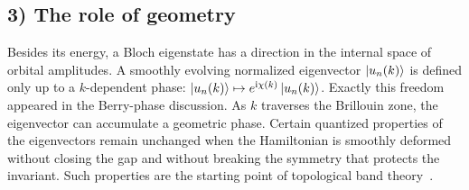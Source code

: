 \subsection*{3) The role of geometry}
Besides its energy, a Bloch eigenstate has a direction in the internal space of orbital amplitudes. A smoothly evolving normalized eigenvector $\left|u_n(k)\right\rangle$ is defined only up to a $k$-dependent phase:
$\left|u_n(k)\right\rangle\mapsto e^{\mathrm{i}\chi(k)}\left|u_n(k)\right\rangle$.
Exactly this freedom appeared in the Berry-phase discussion. As $k$ traverses the Brillouin zone, the eigenvector can accumulate a geometric phase. Certain quantized properties of the eigenvectors remain unchanged when the Hamiltonian is smoothly deformed without closing the gap and without breaking the symmetry that protects the invariant. Such properties are the starting point of topological band theory~\cite{Asboth2016,Zak1989}.